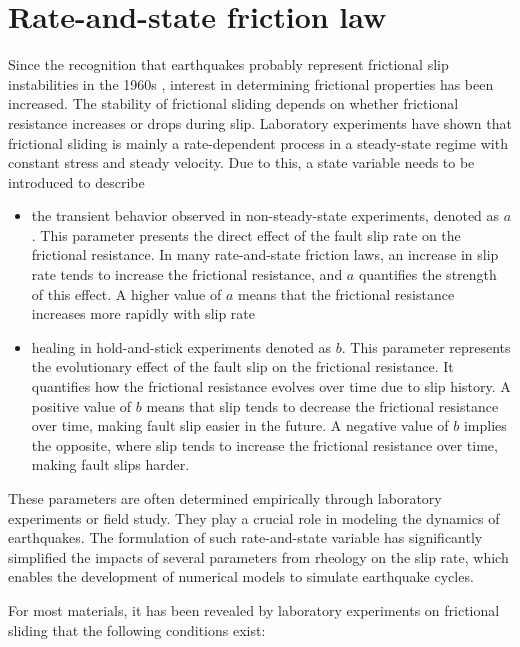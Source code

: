\section{Rate-and-state friction law}
Since the recognition that earthquakes probably represent frictional slip instabilities in the 1960s \citep{brace66}, interest in determining frictional properties has been increased.
The stability of frictional sliding depends on whether frictional resistance increases or drops during slip.
Laboratory experiments have shown that frictional sliding is mainly a rate-dependent process in a steady-state regime with constant stress and steady velocity.
Due to this, a state variable needs to be introduced to describe
\begin{itemize}
    \item the transient behavior observed in non-steady-state experiments, denoted as $a$. This parameter presents the direct effect of the fault slip rate on the frictional resistance. In many rate-and-state friction laws, an increase in slip rate tends to increase the frictional resistance, and $a$ quantifies the strength of this effect. A higher value of $a$ means that the frictional resistance increases more rapidly with slip rate
    \item healing in hold-and-stick experiments denoted as $b$. This parameter represents the evolutionary effect of the fault slip on the frictional resistance. It quantifies how the frictional resistance evolves over time due to slip history. A positive value of $b$ means that slip tends to decrease the frictional resistance over time, making fault slip easier in the future. A negative value of $b$ implies the opposite, where slip tends to increase the frictional resistance over time, making fault slips harder.
\end{itemize}
These parameters are often determined empirically through laboratory experiments or field study. They play a crucial role in modeling the dynamics of earthquakes.
The formulation of such rate-and-state variable has significantly simplified the impacts of several parameters from rheology on the slip rate, which enables the development of numerical models to simulate earthquake cycles.

For most materials, it has been revealed by laboratory experiments on frictional sliding that the following conditions exist:

